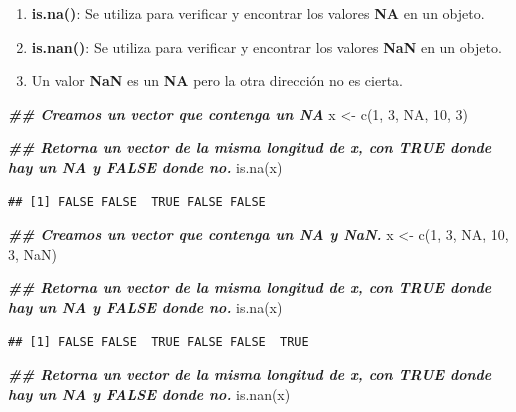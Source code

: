 \documentclass[
  12pt,
]{book}
\newenvironment{Shaded}{\begin{snugshade}}{\end{snugshade}}
\newcommand{\ConstantTok}[1]{\textcolor[rgb]{0.00,0.00,0.00}{#1}}
\newcommand{\DecValTok}[1]{\textcolor[rgb]{0.00,0.00,0.81}{#1}}
\newcommand{\DocumentationTok}[1]{\textcolor[rgb]{0.56,0.35,0.01}{\textbf{\textit{#1}}}}
\newcommand{\FunctionTok}[1]{\textcolor[rgb]{0.00,0.00,0.00}{#1}}
\newcommand{\NormalTok}[1]{#1}
\newcommand{\OtherTok}[1]{\textcolor[rgb]{0.56,0.35,0.01}{#1}}
\begin{document}
\begin{enumerate}
\def\labelenumi{\arabic{enumi}.}
\item
  \textbf{is.na()}: Se utiliza para verificar y encontrar los valores \textbf{NA} en un objeto.
\item
  \textbf{is.nan()}: Se utiliza para verificar y encontrar los valores \textbf{NaN} en un objeto.
\item
  Un valor \textbf{NaN} es un \textbf{NA} pero la otra dirección no es cierta.
\end{enumerate}

\begin{Shaded}
\begin{Highlighting}[]
\DocumentationTok{\#\# Creamos un vector que contenga un NA}
\NormalTok{x }\OtherTok{\textless{}{-}} \FunctionTok{c}\NormalTok{(}\DecValTok{1}\NormalTok{, }\DecValTok{3}\NormalTok{, }\ConstantTok{NA}\NormalTok{, }\DecValTok{10}\NormalTok{, }\DecValTok{3}\NormalTok{)}

\DocumentationTok{\#\# Retorna un vector de la misma longitud de x, con TRUE donde hay un NA y FALSE donde no.}
\FunctionTok{is.na}\NormalTok{(x)}
\end{Highlighting}
\end{Shaded}

\begin{verbatim}
## [1] FALSE FALSE  TRUE FALSE FALSE
\end{verbatim}

\begin{Shaded}
\begin{Highlighting}[]
\DocumentationTok{\#\# Creamos un vector que contenga un NA y NaN.}
\NormalTok{x }\OtherTok{\textless{}{-}} \FunctionTok{c}\NormalTok{(}\DecValTok{1}\NormalTok{, }\DecValTok{3}\NormalTok{, }\ConstantTok{NA}\NormalTok{, }\DecValTok{10}\NormalTok{, }\DecValTok{3}\NormalTok{, }\ConstantTok{NaN}\NormalTok{)}

\DocumentationTok{\#\# Retorna un vector de la misma longitud de x, con TRUE donde hay un NA y FALSE donde no.}
\FunctionTok{is.na}\NormalTok{(x)}
\end{Highlighting}
\end{Shaded}

\begin{verbatim}
## [1] FALSE FALSE  TRUE FALSE FALSE  TRUE
\end{verbatim}

\begin{Shaded}
\begin{Highlighting}[]
\DocumentationTok{\#\# Retorna un vector de la misma longitud de x, con TRUE donde hay un NA y FALSE donde no.}
\FunctionTok{is.nan}\NormalTok{(x)}
\end{Highlighting}
\end{Shaded}
\end{document}
